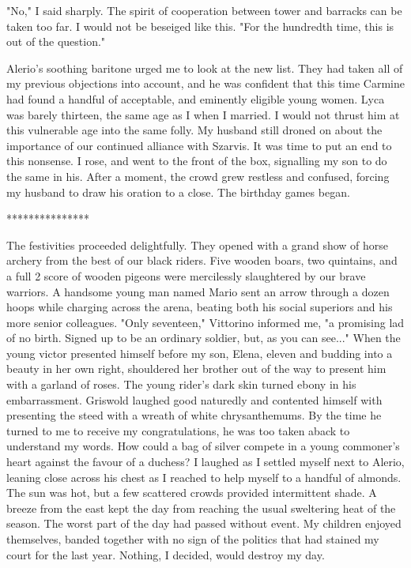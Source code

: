 \documentclass{article}
\begin{document}
"No," I said sharply. The spirit of cooperation between tower and barracks can be taken too far. I would not be beseiged like this. "For the hundredth time, this is out of the question."

Alerio's soothing baritone urged me to look at the new list. They had taken all of my previous objections into account, and he was confident that this time Carmine had found a handful of acceptable, and eminently eligible young women. Lyca was barely thirteen, the same age as I when I married. I would not thrust him at this vulnerable age into the same folly. My husband still droned on about the importance of our continued alliance with Szarvis. It was time to put an end to this nonsense. I rose, and went to the front of the box, signalling my son to do the same in his. After a moment, the crowd grew restless and confused, forcing my husband to draw his oration to a close. The birthday games began.

***************

The festivities proceeded delightfully. They opened with a grand show of horse archery from the best of our black riders. Five wooden boars, two quintains, and a full 2 score of wooden pigeons were mercilessly slaughtered by our brave warriors. A handsome young man named Mario sent an arrow through a dozen hoops while charging across the arena, beating both his social superiors and his more senior colleagues. "Only seventeen," Vittorino informed me, "a promising lad of no birth. Signed up to be an ordinary soldier, but, as you can see..." When the young victor presented himself before my son, Elena, eleven and budding into a beauty in her own right, shouldered her brother out of the way to present him with a garland of roses. The young rider's dark skin turned ebony in his embarrassment. Griswold laughed good naturedly and contented himself with presenting the steed with a wreath of white chrysanthemums.  By the time he turned to me to receive my congratulations, he was too taken aback to understand my words. How could a bag of silver compete in a young commoner's heart against the favour of a duchess? I laughed as I settled myself next to Alerio, leaning close across his chest as I reached to help myself to a handful of almonds. The sun was hot, but a few scattered crowds provided intermittent shade. A breeze from the east kept the day from reaching the usual sweltering heat of the season. The worst part of the day had passed without event. My children enjoyed themselves, banded together with no sign of the politics that had stained my court for the last year. Nothing, I decided, would destroy my day.
\end{document}
